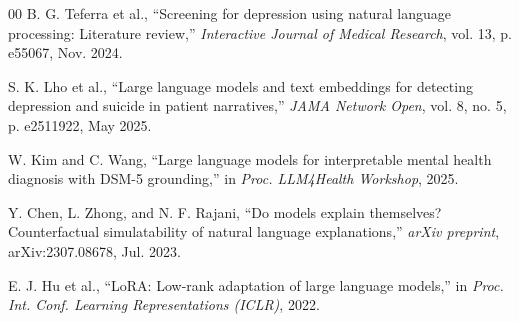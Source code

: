 \documentclass[conference]{IEEEtran}
\begin{document}
\begin{thebibliography}{00}
 B. G. Teferra et al., ``Screening for depression using natural language processing: Literature review,'' \textit{Interactive Journal of Medical Research}, vol. 13, p. e55067, Nov. 2024.

 S. K. Lho et al., ``Large language models and text embeddings for detecting depression and suicide in patient narratives,'' \textit{JAMA Network Open}, vol. 8, no. 5, p. e2511922, May 2025.

 W. Kim and C. Wang, ``Large language models for interpretable mental health diagnosis with DSM-5 grounding,'' in \textit{Proc. LLM4Health Workshop}, 2025.

 Y. Chen, L. Zhong, and N. F. Rajani, ``Do models explain themselves? Counterfactual simulatability of natural language explanations,'' \textit{arXiv preprint}, arXiv:2307.08678, Jul. 2023.

 E. J. Hu et al., ``LoRA: Low-rank adaptation of large language models,'' in \textit{Proc. Int. Conf. Learning Representations (ICLR)}, 2022.

\end{thebibliography}
\end{document}
